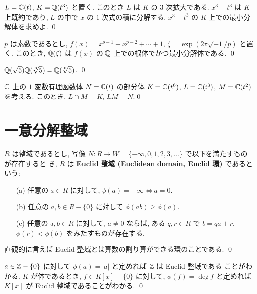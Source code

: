 \documentclass[12pt,twoside]{jarticle}
\begin{document}
\begin{question}
  $L={\mathbb C}(t)$, $K={\mathbb Q}(t^3)$ と置く. このとき $L$ は $K$ の $3$ 次拡大である.
  $x^3-t^3$ は $K$ 上既約であり, $L$ の中で $x$ の $1$ 次式の積に分解する.
  $x^3-t^3$ の $K$ 上での最小分解体を求めよ. \qed
\end{question}

\begin{question}
  $p$ は素数であるとし, $f(x)=x^{p-1}+x^{p-2}+\cdots+1$, 
  $\zeta=\exp(2\pi\sqrt{-1}/p)$ と置く.
  このとき, ${\mathbb Q}(\zeta)$ は $f(x)$ の ${\mathbb Q}$ 上での根体でかつ最小分解体である.
  \qed
\end{question}

\begin{question}
  ${\mathbb Q}(\sqrt{5}){\mathbb Q}(\sqrt[3]{5})={\mathbb Q}(\sqrt[6]{5})$. \qed
\end{question}

\begin{question}
  ${\mathbb C}$ 上の $1$ 変数有理函数体 $N={\mathbb C}(t)$ の部分体 $K={\mathbb C}(t^6)$, 
  $L={\mathbb C}(t^3)$, $M={\mathbb C}(t^2)$ を考える. 
  このとき, $L\cap M=K$, $LM=N$.\qed
\end{question}


\section{一意分解整域}

\begin{definition}[Euclid 整域]
  $R$ は整域であるとし,
  写像 $N:R\to W=\{-\infty,0,1,2,3,\ldots\}$ で以下を満たすものが存在すると
  き, $R$ は {\bf Euclid 整域 (Euclidean domain, Euclid 環)} であるという: 
  \begin{itemize}
  \item[(a)] 任意の $a\in R$ に対して, $\phi(a)=-\infty\iff a=0$.
  \item[(b)] 任意の $a,b\in R-\{0\}$ に対して $\phi(ab)\ge \phi(a)$.
  \item[(c)] 任意の $a,b\in R$ に対して, $a\ne 0$ ならば, ある $q,r\in R$ 
    で $b=qa+r$, $\phi(r) < \phi(b)$ をみたすものが存在する. 
  \end{itemize}
  直観的に言えば Euclid 整域とは算数の割り算ができる環のことである. \qed
\end{definition}

\begin{example}
  $a\in{\mathbb Z}-\{0\}$ に対して $\phi(a)=|a|$ と定めれば ${\mathbb Z}$ は Euclid 整域である
  ことがわかる.  $K$ が体であるとき, $f\in K[x]-\{0\}$ に対して, 
  $\phi(f)=\deg f$ と定めれば $K[x]$ が Euclid 整域であることがわかる. \qed
\end{example}
\end{document}
